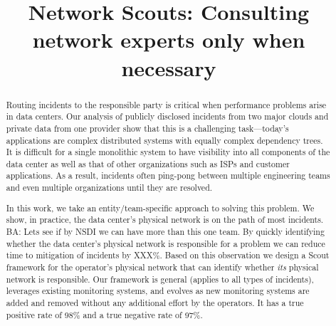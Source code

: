 \documentclass{sig-alternate-10pt}
\date{}
\title{Network Scouts: Consulting network experts only when necessary}
\author{}
\theoremstyle{plain}
\begin{document}
\maketitle

\begin{abstract}
Routing incidents to the responsible party is critical when performance problems arise in data centers.
	Our analysis of publicly disclosed incidents from two major clouds and private data from one provider show that this is a challenging task---today's applications are complex distributed systems with equally complex dependency trees.
	It is difficult for a single monolithic system to have visibility into all components of the data center as well as that of other organizations such as ISPs and customer applications. As a result, incidents often ping-pong between multiple engineering teams and even multiple organizations until they are resolved.
	
	In this work, we take an entity/team-specific approach to solving this problem. We show, in practice, the data center's physical network is on the path of most incidents. {\color{red} BA: Lets see if by NSDI we can have more than this one team.} By quickly identifying whether the data center's physical network is responsible for a problem we can reduce time to mitigation of incidents by XXX\%. Based on this observation we design a Scout framework for the operator's physical network that can identify whether {\em its} physical network is responsible. Our framework is general (applies to all types of incidents), leverages existing monitoring systems, and evolves as new monitoring systems are added and removed without any additional effort by the operators. It has a true positive rate of 98\% and a true negative rate of 97\%. 
	
\end{abstract}





%
%
%

%





\newpage


\end{document}
